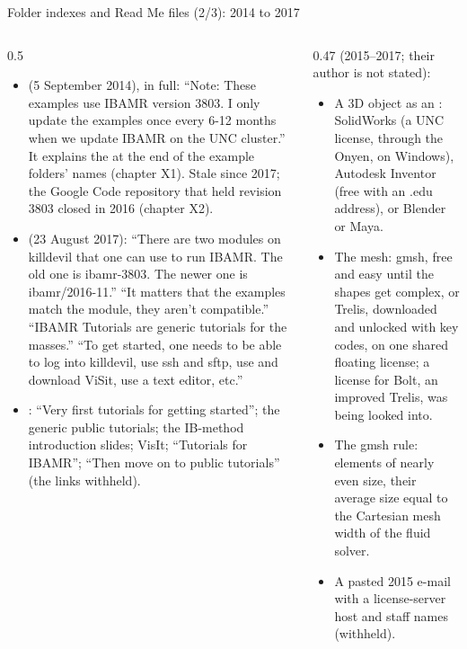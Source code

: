 \documentclass[aspectratio=169,11pt]{beamer}
\begin{document}
\begin{frame}{Folder indexes and Read Me files (2/3): 2014 to 2017}
\label{fr:index2}
\begin{columns}[T,onlytextwidth]
\begin{column}{0.5\textwidth}
\scriptsize
\begin{itemize}\setlength{\itemsep}{3pt}
  \item {} (5 September 2014), in full: ``Note: These examples use IBAMR version 3803. I only update the examples once every 6-12 months when we update IBAMR on the UNC cluster.'' It explains the  at the end of the example folders' names (chapter X1). Stale since 2017; the Google Code repository that held revision 3803 closed in 2016 (chapter X2).
  \item {} (23 August 2017): ``There are two modules on killdevil that one can use to run IBAMR. The old one is ibamr-3803. The newer one is ibamr/2016-11.'' ``It matters that the examples match the module, they aren't compatible.'' ``IBAMR Tutorials are generic tutorials for the masses.'' ``To get started, one needs to be able to log into killdevil, use ssh and sftp, use and download ViSit, use a text editor, etc.''
  \item {}: ``Very first tutorials for getting started''; the generic public tutorials; the IB-method introduction slides; VisIt; ``Tutorials for IBAMR''; ``Then move on to public tutorials'' (the links withheld).
\end{itemize}
\end{column}
\begin{column}{0.47\textwidth}
\scriptsize
{} (2015--2017; their author is not stated):
\begin{itemize}\setlength{\itemsep}{2pt}
  \item A 3D object as an : SolidWorks (a UNC license, through the Onyen, on Windows), Autodesk Inventor (free with an .edu address), or Blender or Maya.
  \item The mesh: gmsh, free and easy until the shapes get complex, or Trelis, downloaded and unlocked with key codes, on one shared floating license; a license for Bolt, an improved Trelis, was being looked into.
  \item The gmsh rule: elements of nearly even size, their average size equal to the Cartesian mesh width of the fluid solver.
  \item A pasted 2015 e-mail with a license-server host and staff names (withheld).

\end{itemize}
\end{column}
\end{columns}
\end{frame}
\end{document}
